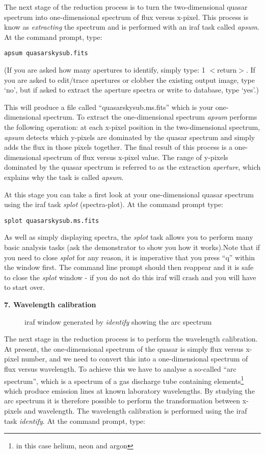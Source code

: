 The next stage of the reduction process is to turn the two-dimensional
quasar spectrum into one-dimensional spectrum of flux versus
x-pixel. This process is know as {\it extracting} the spectrum and is
performed with an {\sc iraf} task called {\it apsum}. At the command
prompt, type:

{\tt apsum quasarskysub.fits}

(If you are asked how many apertures to identify, simply type: 1 $<$return$>$.  If you are asked to edit/trace apertures or clobber
the existing output image, type `no', but if asked to extract the aperture spectra or write to database, type `yes'.)

This will produce a file called ``quasarskysub.ms.fits'' which is your
one-dimensional spectrum. To extract the one-dimensional spectrum
{\it apsum} performs the following operation: at each x-pixel
position in the two-dimensional spectrum, {\it apsum} detects which y-pixels
are dominated by the quasar spectrum and simply adds the flux in those pixels
together. The final result of this process is a one-dimensional
spectrum of flux versus x-pixel value. The range of y-pixels dominated
by the quasar spectrum is referred to as the extraction {\it
aperture}, which explains why the task is called {\it apsum}.

At this stage you can take a first look at your one-dimensional quasar
spectrum using the {\sc iraf} task {\it splot} (spectra-plot). At the
command prompt type:

{\tt splot quasarskysub.ms.fits}

As well as simply displaying spectra, the {\it splot} task allows you
to perform many basic analysis tasks (ask the demonstrator to show you
how it works).Note that if you need to close {\it splot} for any reason,
it is imperative that you press ``q'' within the window first. The command
line prompt should then reappear and it is safe to close the {\it splot} window - 
if you do not do this {\sc iraf} will crash and you will have to start over.



{\large {\bf 7. Wavelength calibration}}

\begin{figure}
\centerline{}
\caption{{\sc iraf} window generated by {\it identify} showing the
arc spectrum}
\end{figure}

The next stage in the reduction process is to perform the wavelength
calibration. At present, the one-dimensional spectrum of the quasar is
simply flux versus x-pixel number, and we need to
convert this into a one-dimensional spectrum of flux versus
wavelength. To achieve this we have to analyse a so-called ``arc
spectrum'', which is a spectrum of a gas discharge tube containing
elements\footnote{in this case helium, neon and argon} which produce emission lines at known laboratory
wavelengths. By studying the arc spectrum it is therefore possible to
perform the transformation between x-pixels and wavelength. The
wavelength calibration is performed using the {\sc iraf} task {\it
identify}. At the command prompt, type:

